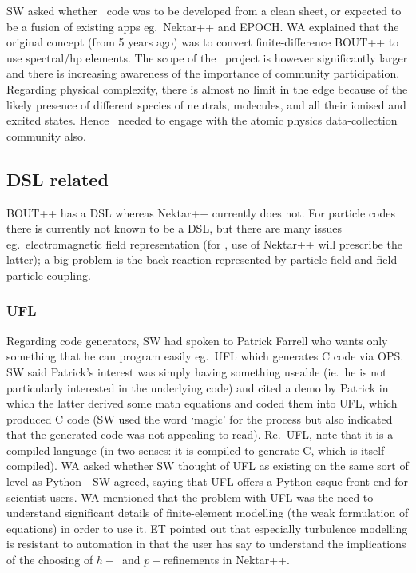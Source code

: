 SW asked whether \nep\  code was to be developed from a clean sheet, or expected 
to be a fusion of existing apps eg.\ Nektar++ and EPOCH.  WA explained that the 
original concept (from 5 years ago) was to convert finite-difference BOUT++ to 
use spectral/hp elements.
The scope of the \nep \ project is however significantly larger 
and there is increasing awareness of the importance of community 
participation.  Regarding physical complexity, there is almost no limit in
the edge because of the likely presence of different species of neutrals, molecules, 
and all their ionised and excited states.  Hence \nep \   needed to  engage with the 
atomic physics data-collection community also. 

\subsection{DSL related}\label{sec:dsl}

BOUT++ has a DSL whereas Nektar++ currently does not. 
For particle codes there is currently not known to be a  DSL, but there are 
many issues eg.\ electromagnetic field representation (for \nep, use of 
Nektar++ will prescribe the latter); a big problem is the back-reaction represented by
particle-field and field-particle coupling.

\subsubsection{UFL}\label{sec:ufl}
Regarding code generators, SW had spoken to 
Patrick Farrell who wants only something that he can program easily eg.\ UFL which 
generates C code via OPS. 
SW said Patrick's interest was simply having something useable (ie.\ he is not 
particularly interested in the underlying code) and cited a demo by Patrick in 
which the latter derived some math equations and coded them into UFL, which 
produced C code (SW used the word `magic' for the process but also indicated 
that the generated code was not appealing to read). 
Re.\ UFL, note that it is a compiled 
language (in two senses: it is compiled to generate C, which is itself compiled). 
WA asked whether SW thought of UFL as existing on the same sort of level as 
Python - SW agreed, saying that UFL offers a Python-esque 
front end for scientist users. %
WA mentioned that the problem with UFL 
was the need to understand significant details of finite-element modelling (the
weak formulation of equations) in order to 
use it. ET pointed out that especially turbulence modelling  is resistant to  automation
in that the user has say to understand the implications of the choosing of $h-$~and $p-$refinements 
in Nektar++.


